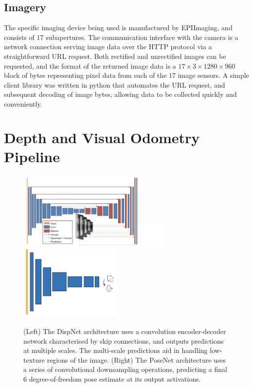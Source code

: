 \subsection{Imagery}

The specific imaging device being used is manufactured by EPIImaging, and consists of 17 subapertures. The communication interface with the camera is a network connection serving image data over the HTTP protocol via a straightforward URL request. Both rectified and unrectified images can be requested, and the format of the returned image data is a $17\times 3 \times 1280 \times 960$ block of bytes representing pixel data from each of the 17 image sensors. A simple client library was written in python that automates the URL request, and subsequent decoding of image bytes, allowing data to be collected quickly and conveniently.


\section{Depth and Visual Odometry Pipeline}

\begin{figure}[htbp]
    \centering 
    \includegraphics[width=2.5in]{images/dispnet.png}
    \includegraphics[width=0.5in]{images/blank.png}
    \includegraphics[width=2in]{images/posenet.png}
    \caption{(Left) The DispNet architecture uses a convolution encoder-decoder network characterised by skip connections, and outputs predictions at multiple scales. The multi-scale predictions aid in handling low-texture regions of the image. (Right) The PoseNet architecture uses a series of convolutional downsampling operations, predicting a final 6 degree-of-freedom pose estimate at its output activations.}
 \end{figure}

